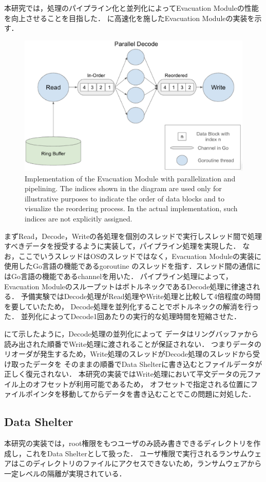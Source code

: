 本研究では，処理のパイプライン化と並列化によってEvacuation Moduleの性能を向上させることを目指した．
に高速化を施したEvacuation Moduleの実装を示す．
\begin{figure}[t]
  \begin{center}
    \includegraphics[width=\columnwidth]{doc/img/evac_mon_impl.eps}
  \end{center}
  \caption{Implementation of the Evacuation Module with parallelization and pipelining.
    The indices shown in the diagram are used only for illustrative purposes to indicate
    the order of data blocks and to visualize the reordering process. In the actual implementation,
    such indices are not explicitly assigned.
  }
  \label{fig:evac-mon-impl}
\end{figure}
まずRead，Decode，Writeの各処理を個別のスレッドで実行しスレッド間で処理すべきデータを授受するように実装して，パイプライン処理を実現した．
なお，ここでいうスレッドはOSのスレッドではなく，Evacuation Moduleの実装に使用したGo言語の機能であるgoroutine \cite{TheGoMem67:online}
のスレッドを指す．スレッド間の通信にはGo言語の機能であるchannelを用いた．
パイプライン処理によって，Evacuation ModuleのスループットはボトルネックであるDecode処理に律速される．
予備実験ではDecode処理がRead処理やWrite処理と比較して4倍程度の時間を要していたため，
Decode処理を並列化することでボトルネックの解消を行った．
並列化によってDecode1回あたりの実行的な処理時間を短縮させた．

にて示したように，Decode処理の並列化によって
データはリングバッファから読み出された順番でWrite処理に渡されることが保証されない．
つまりデータのリオーダが発生するため，Write処理のスレッドがDecode処理のスレッドから受け取ったデータを
そのままの順番でData Shelterに書き込むとファイルデータが正しく復元されない．
本研究の実装ではWrite処理において平文データの元ファイル上のオフセットが利用可能であるため，
オフセットで指定される位置にファイルポインタを移動してからデータを書き込むことでこの問題に対処した．






\subsection{Data Shelter}
本研究の実装では，root権限をもつユーザのみ読み書きできるディレクトリを作成し，これをData Shelterとして扱った．
ユーザ権限で実行されるランサムウェアはこのディレクトリのファイルにアクセスできないため，ランサムウェアから一定レベルの隔離が実現されている．

